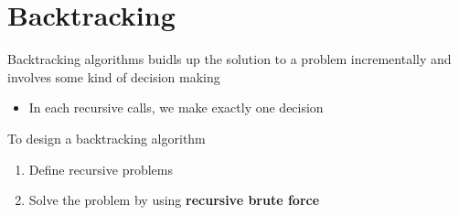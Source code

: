 \chapter{Backtracking}

Backtracking algorithms buidls up the solution to a problem incrementally and
involves some kind of decision making

\begin{itemize}
  \item In each recursive calls, we make exactly one decision
\end{itemize}

To design a backtracking algorithm

\begin{enumerate}
  \item Define recursive problems
  \item Solve the problem by using \textbf{recursive brute force}
\end{enumerate}
